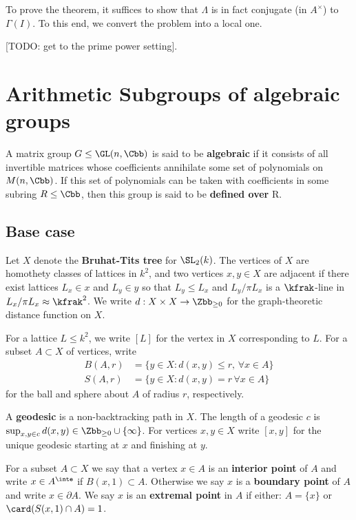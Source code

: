 \documentclass{amsart}
\begin{document}
	To prove the theorem, it suffices to show that $\Lambda$ is in fact conjugate
	(in $A^\times$) to $\Gamma(I)$. To this end, we convert the problem into a local
	one.
	
	[TODO: get to the prime power setting].
	
	
	
	\section{Arithmetic Subgroups of algebraic groups}
	A matrix group $G \leq \GL(n,\Cbb)$ is said to be \textbf{algebraic} if it consists of all invertible matrices whose coefficients annihilate some set of polynomials on $M(n,\Cbb)$. If this set of polynomials can be taken with coefficients in some subring $R \leq \Cbb$, then this group is said to be \textbf{defined over} R.  
	
	
	
	
	\subsection{Base case}
	Let $X$ denote the \textbf{Bruhat-Tits tree} for $\SL_2(k)$. The vertices of $X$ are homothety classes of lattices in $k^2$, and two vertices $x,y \in X$ are adjacent if there exist lattices $L_x \in x$ and $L_y \in y$ so that $L_y \leq L_x$ and $L_y/ \pi L_x$ is a $\kfrak$-line in $L_x / \pi L_x \approx \kfrak^2$. We write $d: X \times X \to \Zbb_{\geq 0}$ for the graph-theoretic distance function on $X$.
	
	For a lattice $L \leq k^2$, we write $[L]$ for the vertex in $X$ corresponding to $L$. For a subset $A \subset X$ of vertices, write
	\begin{align*}
		B(A,r) & = \{ y \in X: d(x,y)\leq  r,\, \forall x \in A\} \\
		S(A,r) & = \{ y \in X: d(x,y) = r \, \forall x \in A\}    
	\end{align*}
	for the ball and sphere about $A$ of radius $r$, respectively.
	
	A \textbf{geodesic} is a non-backtracking path in $X$.  The length of a geodesic $c$ is $\sup_{x,y \in c} d(x,y) \in \Zbb_{\geq 0} \cup \{\infty\}$. For vertices $x,y
	\in X$ write $[x,y]$ for the unique geodesic starting at $x$ and finishing at $y$.
	
	For a subset $A \subset X$ we say that a vertex $x\in A$ is an {\bf interior point} of $A$ and write $x\in A^\inte$ if $B(x,1) \subset A$. Otherwise we say $x$ is a {\bf boundary point} of $A$ and write $x\in \partial A$. We say $x$ is an \textbf{extremal point} in $A$ if either: $A=\{x\}$ or $\card(S(x,1) \cap A) = 1$.
	
\end{document}
